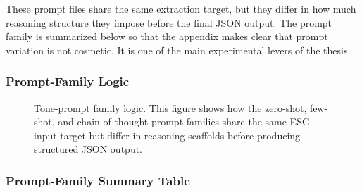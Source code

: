 These prompt files share the same extraction target, but they differ in how much reasoning structure they impose before the final JSON output. The prompt family is summarized below so that the appendix makes clear that prompt variation is not cosmetic. It is one of the main experimental levers of the thesis.

\subsubsection{Prompt-Family Logic}\label{prompt-family-logic}

\begin{figure}[ht]
\begin{center}
\end{center}
\caption{Tone-prompt family logic. This figure shows how the zero-shot, few-shot, and chain-of-thought prompt families share the same ESG input target but differ in reasoning scaffolds before producing structured JSON output.}
\label{fig:appendix_tone_prompt_family_logic}
\end{figure}

\subsubsection{Prompt-Family Summary Table}\label{prompt-family-summary-table}

